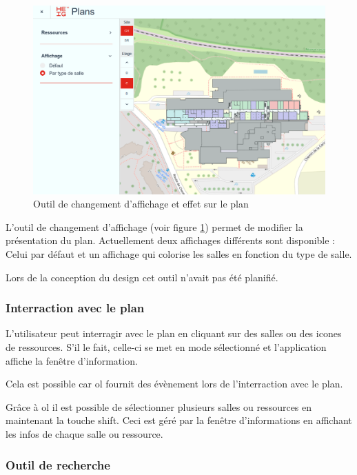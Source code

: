 \documentclass[
    iai, %
    il, %
]{heig-tb}
\begin{document}
\begin{figure}[h]
    \centering
    \includegraphics[scale=0.4]{frontend-affichageParType.png}
    \caption{Outil de changement d'affichage et effet sur le plan}
    \label{fig:affichage}
\end{figure}

L'outil de changement d'affichage (voir figure \ref{fig:affichage}) permet de modifier la présentation du plan.
Actuellement deux affichages différents sont disponible :
Celui par défaut et un affichage qui colorise les salles en fonction du type de salle.

Lors de la conception du design cet outil n'avait pas été planifié.

\subsubsection{Interraction avec le plan}
L'utilisateur peut interragir avec le plan en cliquant sur des salles ou des icones de ressources.
S'il le fait, celle-ci se met en mode sélectionné et l'application affiche la fenêtre d'information.

Cela est possible car \gls{ol} fournit des évènement lors de l'interraction avec le plan.

Grâce à \gls{ol} il est possible de sélectionner plusieurs salles ou ressources en maintenant la touche shift.
Ceci est géré par la fenêtre d'informations en affichant les infos de chaque salle ou ressource.

\subsubsection{Outil de recherche}
\end{document}
